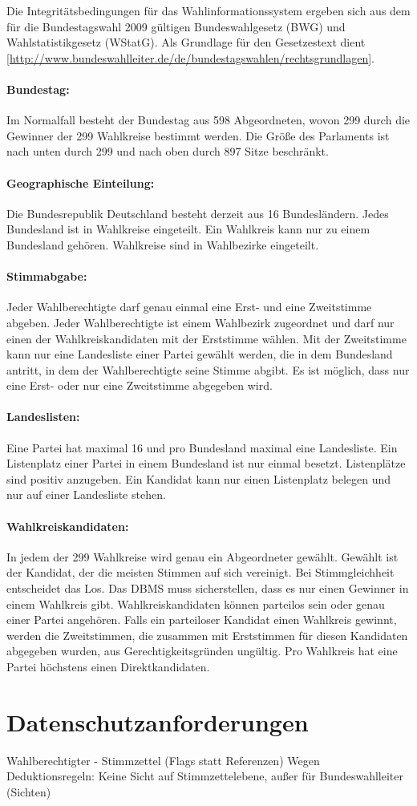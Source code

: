 \documentclass[a4paper]{article}
\begin{document}
Die Integritätsbedingungen für das Wahlinformationssystem ergeben sich aus dem für die Bundestagswahl 2009 gültigen Bundeswahlgesetz (BWG) und Wahlstatistikgesetz (WStatG). Als Grundlage für den Gesetzestext dient [\url{http://www.bundeswahlleiter.de/de/bundestagswahlen/rechtsgrundlagen}].

\paragraph{Bundestag:} Im Normalfall besteht der Bundestag aus 598 Abgeordneten, wovon 299 durch die Gewinner der 299 Wahlkreise bestimmt werden. Die Größe des Parlaments ist nach unten durch 299 und nach oben durch 897 Sitze beschränkt. 

\paragraph{Geographische Einteilung:} Die Bundesrepublik Deutschland besteht derzeit aus 16 Bundesländern. Jedes Bundesland ist in Wahlkreise eingeteilt. Ein Wahlkreis kann nur zu einem Bundesland gehören. Wahlkreise sind in Wahlbezirke eingeteilt.

\paragraph{Stimmabgabe:} Jeder Wahlberechtigte darf genau einmal eine Erst- und eine Zweitstimme abgeben. Jeder Wahlberechtigte ist einem Wahlbezirk zugeordnet und darf nur einen der Wahlkreiskandidaten mit der Erststimme wählen. Mit der Zweitstimme kann nur eine Landesliste einer Partei gewählt werden, die in dem Bundesland antritt, in dem der Wahlberechtigte seine Stimme abgibt. Es ist möglich, dass nur eine Erst- oder nur eine Zweitstimme abgegeben wird.

\paragraph{Landeslisten:} Eine Partei hat maximal 16 und pro Bundesland maximal eine Landesliste. Ein Listenplatz einer Partei in einem Bundesland ist nur einmal besetzt. Listenplätze sind positiv anzugeben. Ein Kandidat kann nur einen Listenplatz belegen und nur auf einer Landesliste stehen.

\paragraph{Wahlkreiskandidaten:} In jedem der 299 Wahlkreise wird genau ein Abgeordneter gewählt. Gewählt ist der Kandidat, der die meisten Stimmen auf sich vereinigt. Bei Stimmgleichheit entscheidet das Los. Das DBMS muss sicherstellen, dass es nur einen Gewinner in einem Wahlkreis gibt. Wahlkreiskandidaten können parteilos sein oder genau einer Partei angehören. Falls ein parteiloser Kandidat einen Wahlkreis gewinnt, werden die Zweitstimmen, die zusammen mit Erststimmen für diesen Kandidaten abgegeben wurden, aus Gerechtigkeitsgründen ungültig. Pro Wahlkreis hat eine Partei höchstens einen Direktkandidaten.

\section{Datenschutzanforderungen}

Wahlberechtigter - Stimmzettel (Flags statt Referenzen)
Wegen Deduktionsregeln: Keine Sicht auf Stimmzettelebene, außer für Bundeswahlleiter (Sichten)
\end{document}
